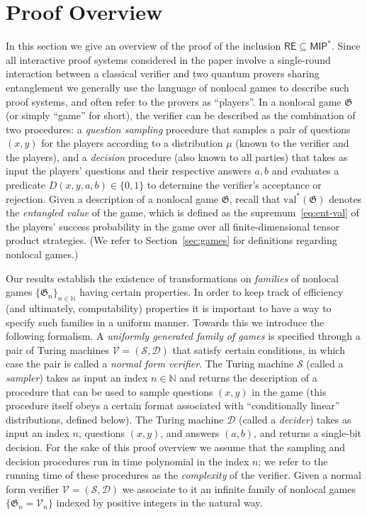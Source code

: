 \documentclass[11pt]{article}
\theoremstyle{definition}
\newcommand{\N}{\ensuremath{\mathbb{N}}}
\newcommand{\val}{\ensuremath{\mathrm{val}}}
\newcommand{\game}{\mathfrak{G}}
\newcommand{\sampler}{\mathcal{S}}
\newcommand{\decider}{\mathcal{D}}
\newcommand{\verifier}{\mathcal{V}}
\newcommand{\class}[1]{\ensuremath{\mathsf{#1}}\xspace}
\newcommand{\MIP}{\class{MIP}} %
\newcommand{\RE}{\class{RE}} %
\begin{document}

\section{Proof Overview}
\label{sec:overview}

In this section we give an overview of the proof of the inclusion $\RE \subseteq \MIP^*$. Since all interactive proof systems considered in the paper involve a single-round interaction between a classical verifier and two quantum provers sharing entanglement we generally use the language of nonlocal games to describe such proof systems, and often refer to the provers as ``players''. In a nonlocal game $\game$ (or simply ``game'' for short), the verifier can be described as the combination of two procedures: a \emph{question sampling} procedure that samples a pair of questions $(x,y)$ for the players according to a distribution $\mu$ (known to the verifier and the players), and a \emph{decision} procedure (also known to all parties) that takes as input the players' questions and their respective answers $a,b$ and evaluates a predicate $D(x,y,a,b)\in \{0,1\}$ to determine the verifier's acceptance or rejection. Given a description of a nonlocal game $\game$, recall that $\val^*(\game)$ denotes the \emph{entangled value} of the game, which is defined as the supremum~\eqref{eq:ent-val} of the players' success probability in the game over all finite-dimensional tensor product strategies. (We refer to Section~\ref{sec:games} for definitions regarding nonlocal games.) 

Our results establish the existence of transformations on \emph{families} of nonlocal games $\{\game_n\}_{n\in \N}$ having certain properties. In order to keep track of efficiency (and ultimately, computability) properties it is important to have a way to specify such families in a {uniform} manner. Towards this we introduce the following formalism. A \emph{uniformly generated family of games} is specified through a pair of Turing machines $\verifier = (\sampler,\decider)$ that satisfy certain conditions, in which case the pair is called a \emph{normal form verifier}. The Turing machine $\sampler$ (called a \emph{sampler}) takes as input an index $n \in \N$ and returns the description of a procedure that can be used to sample questions $(x,y)$ in the game (this procedure itself obeys a certain format associated with ``conditionally linear'' distributions, defined below). The Turing machine $\decider$ (called a \emph{decider}) takes as input an index $n$, questions $(x,y)$, and answers $(a,b)$, and returns a single-bit decision. For the sake of this proof overview we assume that the sampling and decision procedures run in time polynomial in the index $n$; we refer to the running time of these procedures as the \emph{complexity} of the verifier. 
	Given a normal form verifier $\verifier= (\sampler,\decider)$ we associate to it an infinite family of nonlocal games $\{\game_n =  \verifier_n \}$ indexed by positive integers in the natural way.  
	
\end{document}
